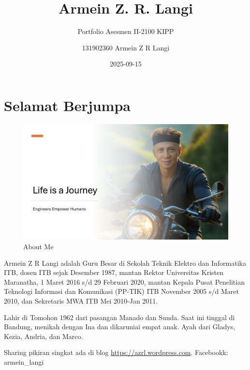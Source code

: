 \documentclass[
  letterpaper,
  DIV=11,
  numbers=noendperiod]{scrreprt}
\title{Armein Z. R. Langi}
\subtitle{Portfolio Asesmen II-2100 KIPP}
\author{131902360 Armein Z R Langi}
\date{2025-09-15}
\renewcommand*\contentsname{Table of contents}
\newcommand\contentsname{Table of contents}
\begin{document}
\maketitle

\renewcommand*\contentsname{Table of contents}
{
\hypersetup{linkcolor=}
\setcounter{tocdepth}{2}
\tableofcontents
}


\chapter*{Selamat Berjumpa}\label{selamat-berjumpa}


\begin{figure}[H]

{\centering \includegraphics[width=9.5\linewidth,height=\textheight,keepaspectratio]{images/AZRL.png}

}

\caption{About Me}

\end{figure}%

Armein Z R Langi adalah Guru Besar di Sekolah Teknik Elektro dan
Informatika ITB, dosen ITB sejak Desember 1987, mantan Rektor
Universitas Kristen Maranatha, 1 Maret 2016 s/d 29 Februari 2020, mantan
Kepala Pusat Penelitian Teknologi Informasi dan Komunikasi (PP-TIK) ITB
November 2005 s/d Maret 2010, dan Sekretaris MWA ITB Mei 2010-Jan 2011.

Lahir di Tomohon 1962 dari pasangan Manado dan Sunda. Saat ini tinggal
di Bandung, menikah dengan Ina dan dikaruniai empat anak. Ayah dari
Gladys, Kezia, Andria, dan Marco.

Sharing pikiran singkat ada di blog \url{https://azrl.wordpress.com}.
Facebookk: armein\_langi
\end{document}
